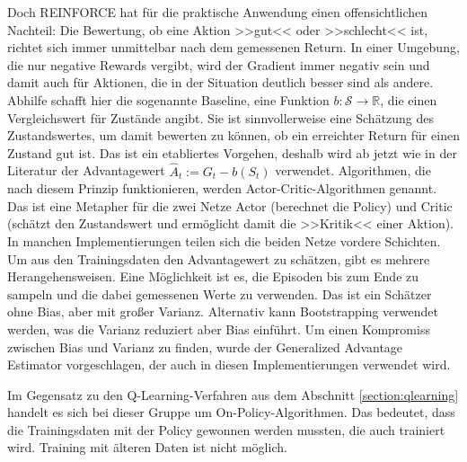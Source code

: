 Doch REINFORCE hat für die praktische Anwendung einen offensichtlichen Nachteil: Die Bewertung, ob eine Aktion >>gut<< oder >>schlecht<< ist, richtet sich immer unmittelbar nach dem gemessenen Return.
In einer Umgebung, die nur negative Rewards vergibt, wird der Gradient immer negativ sein und damit auch für Aktionen, die in der Situation deutlich besser sind als andere.
Abhilfe schafft hier die sogenannte Baseline, eine Funktion $b: \mathcal{S} \rightarrow \mathbb{R}$, die einen Vergleichswert für Zustände angibt.
Sie ist sinnvollerweise eine Schätzung des Zustandswertes, um damit bewerten zu können, ob ein erreichter Return für einen Zustand gut ist.
Das ist ein etabliertes Vorgehen, deshalb wird ab jetzt wie in der Literatur der Advantagewert $\hat{A}_t := G_t - b(S_t)$ verwendet.
Algorithmen, die nach diesem Prinzip funktionieren, werden Actor-Critic-Algorithmen genannt.
Das ist eine Metapher für die zwei Netze Actor (berechnet die Policy) und Critic (schätzt den Zustandswert und ermöglicht damit die >>Kritik<< einer Aktion).
In manchen Implementierungen teilen sich die beiden Netze vordere Schichten.
Um aus den Trainingsdaten den Advantagewert zu schätzen, gibt es mehrere Herangehensweisen.
Eine Möglichkeit ist es, die Episoden bis zum Ende zu sampeln und die dabei gemessenen Werte zu verwenden.
Das ist ein Schätzer ohne Bias, aber mit großer Varianz.
Alternativ kann Bootstrapping verwendet werden, was die Varianz reduziert aber Bias einführt.
Um einen Kompromiss zwischen Bias und Varianz zu finden, wurde der Generalized Advantage Estimator vorgeschlagen, \cite{https://doi.org/10.48550/arxiv.1506.02438} der auch in diesen Implementierungen verwendet wird.

Im Gegensatz zu den Q-Learning-Verfahren aus dem Abschnitt \ref{section:qlearning} handelt es sich bei dieser Gruppe um On-Policy-Algorithmen.
Das bedeutet, dass die Trainingsdaten mit der Policy gewonnen werden mussten, die auch trainiert wird.
Training mit älteren Daten ist nicht möglich.

